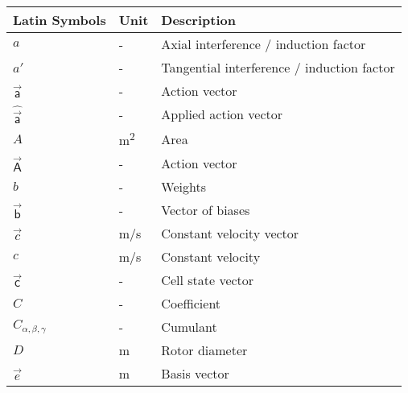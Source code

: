 \begin{longtable}{p{5cm}p{4cm}p{5cm}}
	Latin Symbols 			& Unit      	& Description      \\ \hline
	$a$						& \si{-}		& Axial interference / induction factor \\
	$a'$					& \si{-}		& Tangential interference / induction factor \\
	$\vec{\mathsf{a}}$		& \si{-}		& Action vector \\
	$\hat{\vec{\mathsf{a}}}$& \si{-}		& Applied action vector \\
	$A$						& \si{m\squared}	& Area \\
	$\vec{\mathsf{A}}$		& \si{-}		& Action vector \\
	$b$						& \si{-}		& Weights \\
	$\vec{\mathsf{b}}$		& \si{-}		& Vector of biases \\
    $\vec{c}$               & \si{m/s}    & Constant velocity vector \\
    $c$                     & \si{m/s}    & Constant velocity \\
   	$\vec{\mathsf{c}}$		& \si{-}		& Cell state vector \\
    $C$						& \si{-}		& Coefficient \\
    $C_{\alpha, \beta, \gamma}$& \si{-}	& Cumulant \\
    $D$						& \si{m}		& Rotor diameter \\
    $\vec{e}$				& \si{m}		& Basis vector \\

\end{longtable}
